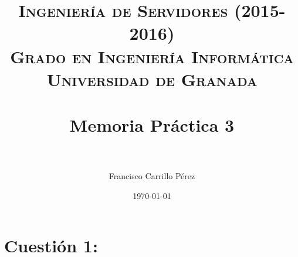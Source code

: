 

\title{	
\normalfont \normalsize 
\textsc{{\bf Ingeniería de Servidores (2015-2016)} \\ Grado en Ingeniería Informática \\ Universidad de Granada} \\ [25pt] %
\horrule{0.5pt} \\[0.4cm] %
\huge Memoria Práctica 3 \\ %
\horrule{2pt} \\[0.5cm] %
}

\author{Francisco Carrillo Pérez} %

\date{\normalsize\today} %




\maketitle %

\newpage %

\tableofcontents %

\listoffigures

\listoftables

\newpage


\section{Cuestión 1:}
